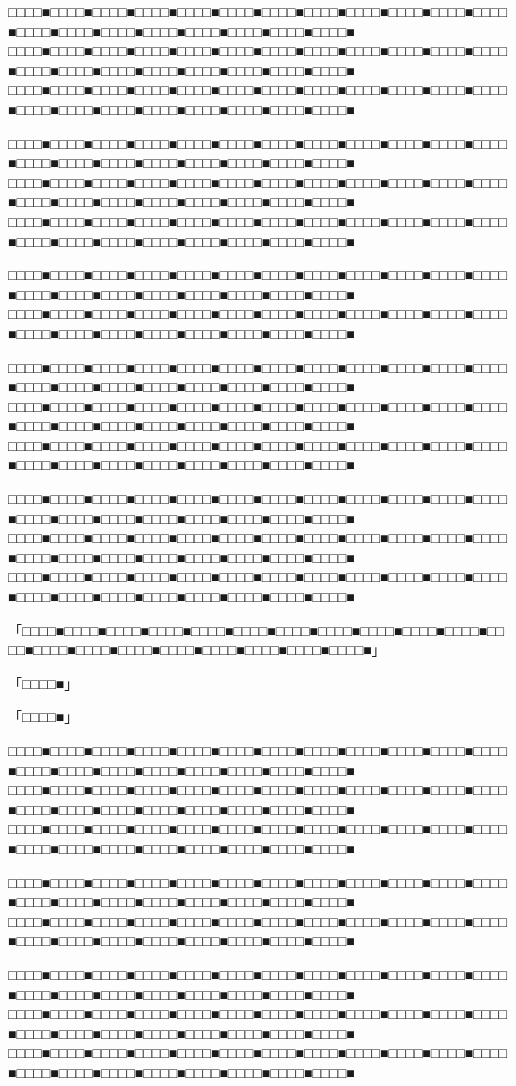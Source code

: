 \documentclass[
tate,
book,
openany,
paper={202mm,270mm},
oneside,
fontsize=9pt, %
jafontsize=9pt, %
head_space=11truemm, %
gutter=8truemm, %
line_length=78zw, %
number_of_lines=35, %
column_gap=5truemm,%
headfoot_verticalposition=4truemm,%
draft
]{jlreq}
\begin{document}
\begin{multicols*}{3}
□□□□■□□□□■□□□□■□□□□■□□□□■□□□□■□□□□■□□□□■□□□□■□□□□■□□□□■□□□□■□□□□■□□□□■□□□□■□□□□■□□□□■□□□□■□□□□■□□□□■
□□□□■□□□□■□□□□■□□□□■□□□□■□□□□■□□□□■□□□□■□□□□■□□□□■□□□□■□□□□■□□□□■□□□□■□□□□■□□□□■□□□□■□□□□■□□□□■□□□□■
□□□□■□□□□■□□□□■□□□□■□□□□■□□□□■□□□□■□□□□■□□□□■□□□□■□□□□■□□□□■□□□□■□□□□■□□□□■□□□□■□□□□■□□□□■□□□□■□□□□■

□□□□■□□□□■□□□□■□□□□■□□□□■□□□□■□□□□■□□□□■□□□□■□□□□■□□□□■□□□□■□□□□■□□□□■□□□□■□□□□■□□□□■□□□□■□□□□■□□□□■
□□□□■□□□□■□□□□■□□□□■□□□□■□□□□■□□□□■□□□□■□□□□■□□□□■□□□□■□□□□■□□□□■□□□□■□□□□■□□□□■□□□□■□□□□■□□□□■□□□□■
□□□□■□□□□■□□□□■□□□□■□□□□■□□□□■□□□□■□□□□■□□□□■□□□□■□□□□■□□□□■□□□□■□□□□■□□□□■□□□□■□□□□■□□□□■□□□□■□□□□■

□□□□■□□□□■□□□□■□□□□■□□□□■□□□□■□□□□■□□□□■□□□□■□□□□■□□□□■□□□□■□□□□■□□□□■□□□□■□□□□■□□□□■□□□□■□□□□■□□□□■
□□□□■□□□□■□□□□■□□□□■□□□□■□□□□■□□□□■□□□□■□□□□■□□□□■□□□□■□□□□■□□□□■□□□□■□□□□■□□□□■□□□□■□□□□■□□□□■□□□□■

□□□□■□□□□■□□□□■□□□□■□□□□■□□□□■□□□□■□□□□■□□□□■□□□□■□□□□■□□□□■□□□□■□□□□■□□□□■□□□□■□□□□■□□□□■□□□□■□□□□■
□□□□■□□□□■□□□□■□□□□■□□□□■□□□□■□□□□■□□□□■□□□□■□□□□■□□□□■□□□□■□□□□■□□□□■□□□□■□□□□■□□□□■□□□□■□□□□■□□□□■
□□□□■□□□□■□□□□■□□□□■□□□□■□□□□■□□□□■□□□□■□□□□■□□□□■□□□□■□□□□■□□□□■□□□□■□□□□■□□□□■□□□□■□□□□■□□□□■□□□□■

□□□□■□□□□■□□□□■□□□□■□□□□■□□□□■□□□□■□□□□■□□□□■□□□□■□□□□■□□□□■□□□□■□□□□■□□□□■□□□□■□□□□■□□□□■□□□□■□□□□■
□□□□■□□□□■□□□□■□□□□■□□□□■□□□□■□□□□■□□□□■□□□□■□□□□■□□□□■□□□□■□□□□■□□□□■□□□□■□□□□■□□□□■□□□□■□□□□■□□□□■
□□□□■□□□□■□□□□■□□□□■□□□□■□□□□■□□□□■□□□□■□□□□■□□□□■□□□□■□□□□■□□□□■□□□□■□□□□■□□□□■□□□□■□□□□■□□□□■□□□□■

「□□□□■□□□□■□□□□■□□□□■□□□□■□□□□■□□□□■□□□□■□□□□■□□□□■□□□□■□□□□■□□□□■□□□□■□□□□■□□□□■□□□□■□□□□■□□□□■□□□□■」

「□□□□■」

「□□□□■」

□□□□■□□□□■□□□□■□□□□■□□□□■□□□□■□□□□■□□□□■□□□□■□□□□■□□□□■□□□□■□□□□■□□□□■□□□□■□□□□■□□□□■□□□□■□□□□■□□□□■
□□□□■□□□□■□□□□■□□□□■□□□□■□□□□■□□□□■□□□□■□□□□■□□□□■□□□□■□□□□■□□□□■□□□□■□□□□■□□□□■□□□□■□□□□■□□□□■□□□□■
□□□□■□□□□■□□□□■□□□□■□□□□■□□□□■□□□□■□□□□■□□□□■□□□□■□□□□■□□□□■□□□□■□□□□■□□□□■□□□□■□□□□■□□□□■□□□□■□□□□■

□□□□■□□□□■□□□□■□□□□■□□□□■□□□□■□□□□■□□□□■□□□□■□□□□■□□□□■□□□□■□□□□■□□□□■□□□□■□□□□■□□□□■□□□□■□□□□■□□□□■
□□□□■□□□□■□□□□■□□□□■□□□□■□□□□■□□□□■□□□□■□□□□■□□□□■□□□□■□□□□■□□□□■□□□□■□□□□■□□□□■□□□□■□□□□■□□□□■□□□□■

□□□□■□□□□■□□□□■□□□□■□□□□■□□□□■□□□□■□□□□■□□□□■□□□□■□□□□■□□□□■□□□□■□□□□■□□□□■□□□□■□□□□■□□□□■□□□□■□□□□■
□□□□■□□□□■□□□□■□□□□■□□□□■□□□□■□□□□■□□□□■□□□□■□□□□■□□□□■□□□□■□□□□■□□□□■□□□□■□□□□■□□□□■□□□□■□□□□■□□□□■
□□□□■□□□□■□□□□■□□□□■□□□□■□□□□■□□□□■□□□□■□□□□■□□□□■□□□□■□□□□■□□□□■□□□□■□□□□■□□□□■□□□□■□□□□■□□□□■□□□□■


\end{multicols*}
\end{document}
